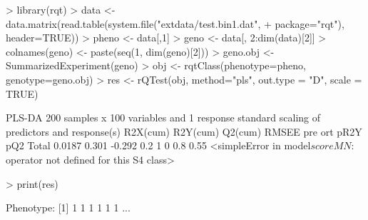\documentclass{article}
\begin{document}
\begin{Schunk}
\begin{Sinput}
> library(rqt)
> data <- data.matrix(read.table(system.file("extdata/test.bin1.dat",
+                                            package="rqt"), header=TRUE))
> pheno <- data[,1]
> geno <- data[, 2:dim(data)[2]]
> colnames(geno) <- paste(seq(1, dim(geno)[2]))
> geno.obj <- SummarizedExperiment(geno)
> obj <- rqtClass(phenotype=pheno, genotype=geno.obj)
> res <- rQTest(obj, method="pls", out.type = "D", scale = TRUE)
\end{Sinput}
\begin{Soutput}
PLS-DA
200 samples x 100 variables and 1 response
standard scaling of predictors and response(s)
      R2X(cum) R2Y(cum) Q2(cum) RMSEE pre ort pR2Y  pQ2
Total   0.0187    0.301  -0.292   0.2   1   0  0.8 0.55
<simpleError in model$scoreMN: $ operator not defined for this S4 class>
\end{Soutput}
\begin{Sinput}
> print(res)
\end{Sinput}
\begin{Soutput}
Phenotype:
[1] 1 1 1 1 1 1
...


\end{Soutput}
\end{Schunk}
\end{document}

